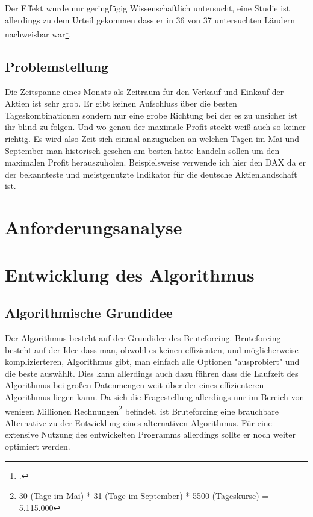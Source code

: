 \documentclass[12pt, a4paper, titlepage]{report}
\begin{document}
            Der Effekt wurde nur geringfügig Wissenschaftlich untersucht, eine
            Studie ist allerdings zu dem Urteil gekommen dass er in 36 von 37
            untersuchten Ländern nachweisbar war\footcite{bouman2002halloween}. %

        \section{Problemstellung}
            Die Zeitspanne eines Monats als Zeitraum für den Verkauf und Einkauf
            der Aktien ist sehr grob. Er gibt keinen Aufschluss über die besten
            Tageskombinationen sondern nur eine grobe Richtung bei der es zu
            unsicher ist ihr blind zu folgen. Und wo genau der maximale Profit
            steckt weiß auch so keiner richtig. Es wird also Zeit sich einmal
            anzugucken an welchen Tagen im Mai und September man historisch
            gesehen am besten hätte handeln sollen um den maximalen Profit
            herauszuholen. Beispielsweise verwende ich hier den DAX da er der
            bekannteste und meistgenutzte Indikator für die deutsche
            Aktienlandschaft ist.

    \chapter{Anforderungsanalyse}

    \chapter{Entwicklung des Algorithmus}

        \section{Algorithmische Grundidee}
            Der Algorithmus besteht auf der Grundidee des Bruteforcing.
            Bruteforcing besteht auf der Idee dass man, obwohl es keinen
            effizienten, und möglicherweise komplizierteren, Algorithmus gibt, man
            einfach alle Optionen "ausprobiert" und die beste auswählt. Dies kann
            allerdings auch dazu führen dass die Laufzeit des Algorithmus bei großen
            Datenmengen weit über der eines effizienteren Algorithmus liegen kann.
            Da sich die Fragestellung allerdings nur im Bereich von wenigen Millionen
            Rechnungen\footnote{30 (Tage im Mai) * 31 (Tage im September) * 5500
            (Tageskurse) = 5.115.000} befindet, ist Bruteforcing eine brauchbare
            Alternative zu der Entwicklung eines alternativen Algorithmus.
   			Für eine extensive Nutzung des entwickelten Programms allerdings sollte
   			er noch weiter optimiert werden.
\end{document}

